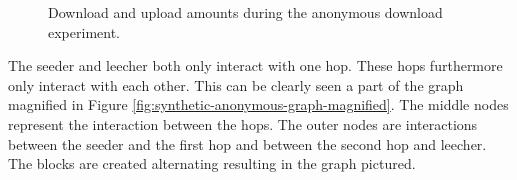 \begin{figure}
\centering
{}
\caption{Download and upload amounts during the anonymous download experiment.}
\label{fig:synthetic-anonymous-amounts}
\end{figure}

The seeder and leecher both only interact with one hop.
These hops furthermore only interact with each other.
This can be clearly seen a part of the graph magnified in Figure \ref{fig:synthetic-anonymous-graph-magnified}.
The middle nodes represent the interaction between the hops.
The outer nodes are interactions between the seeder and the first hop and between the second hop and leecher.
The blocks are created alternating resulting in the graph pictured.

